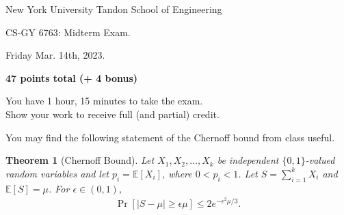 \documentclass[10pt]{article}
\newcommand{\E}{\mathbb{E}}
\newtheorem{theorem}{Theorem}
\begin{document}
	
\begin{center}
	\normalsize
	New York University Tandon School of Engineering
		\medskip
	
	\large
	CS-GY 6763: Midterm Exam. 
	
	Friday  Mar. 14th, 2023.
	
	\textbf{47 points total (+ 4 bonus)}
	
	\vspace{1em}
	You have 1 hour, 15 minutes to take the exam.\\
	Show your work to receive full (and partial) credit.

	\vspace{1em}
	You may find the following statement of the Chernoff bound from class useful.
\end{center} 

\begin{framed}
	\vspace{-.75em}
\begin{theorem}[Chernoff Bound]
	Let $X_1,X_2,\ldots,X_k$ be independent $\{0,1\}$-valued random variables and let
	$p_i = \E[X_i]$, where $0<p_i<1$.
	Let $S = \sum_{i=1}^{k} X_i$ and $\E[S] = \mu$. For $\epsilon \in (0,1)$,
	\begin{align*}
			\Pr[|S - \mu| \geq \epsilon \mu] \leq 2e^{-\epsilon^2 \mu/3}.
	\end{align*}
\end{theorem} 
\vspace{-.75em}
\end{framed}
\end{document}
